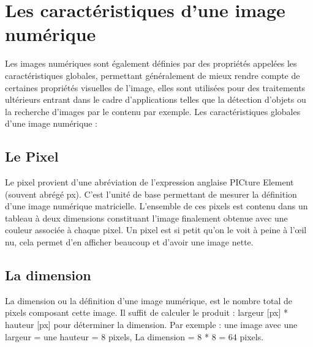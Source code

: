 \begin{table}[H]
\begin{tabular}{|l|l|l|l|}
	\end{tabular}
	
\end{table}

\section{Les caractéristiques d’une image numérique}
Les images numériques sont également définies par des propriétés appelées les caractéristiques globales, permettant généralement de mieux rendre compte de certaines propriétés visuelles de l'image, elles sont utilisées pour des traitements ultérieurs entrant dans le cadre d'applications telles que la détection d'objets ou la recherche d'images par le contenu par exemple.
Les caractéristiques globales d’une image numérique :

\subsection{Le Pixel}
Le pixel provient d’une abréviation de l’expression anglaise PICture Element (souvent abrégé px). C’est l'unité de base permettant de mesurer la
définition d'une image numérique matricielle.
L'ensemble de ces pixels est contenu dans un tableau à deux dimensions
constituant l'image finalement obtenue avec une couleur associée à chaque
pixel. Un pixel est si petit qu'on le voit à peine à l'œil nu, cela permet d'en
afficher beaucoup et d'avoir une image nette.

\subsection{La dimension}
La dimension ou la définition d’une image numérique, est le nombre total de pixels composant cette image. Il suffit de calculer le produit : largeur [px] * hauteur [px] pour déterminer la dimension. Par exemple : une image
avec une largeur = une hauteur = 8 pixels, La dimension = 8 * 8 = 64 pixels.

